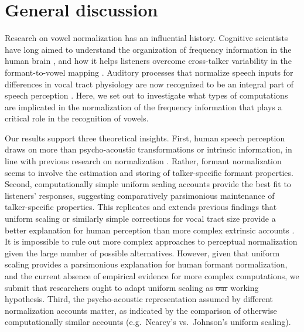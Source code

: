 \documentclass[preprint]{JASA}
\providecommand{\DIFadd}[1]{{\protect\color{blue}\uwave{#1}}} %
\providecommand{\DIFdel}[1]{{\protect\color{red}\sout{#1}}}                      %
\providecommand{\DIFaddbegin}{} %
\providecommand{\DIFaddend}{} %
\providecommand{\DIFdelbegin}{} %
\providecommand{\DIFdelend}{} %
\begin{document}
\section{General discussion}\label{sec:G-D}

Research on vowel normalization has an influential history. Cognitive scientists have long aimed to understand the organization of frequency information in the human brain \citep{stevens-volkmann1940, siegel1965}, and how it helps listeners overcome cross-talker variability in the formant-to-vowel mapping \citep[e.g.,][]{joos1948, fant1975, nordstrom-lindblom1975}. Auditory processes that normalize speech inputs for differences in vocal tract physiology are now recognized to be an integral part of speech perception \citep{mcmurray-jongman2011, johnson-sjerps2021, xie2023}. Here, we set out to investigate what types of computations are implicated in the normalization of the frequency information that plays a critical role in the recognition of vowels.

Our results support three theoretical insights. First, human speech perception draws on more than psycho-acoustic transformations or intrinsic information, in line with previous research on normalization \citep{nearey1989, ladefoged-broadbent1957, adank2004}. Rather, formant normalization seems to involve the estimation and storing of talker-specific formant properties. Second, computationally simple uniform scaling accounts provide the best fit to listeners' responses, suggesting comparatively parsimonious maintenance of talker-specific properties. This replicates and extends previous findings that uniform scaling or similarly simple corrections for vocal tract size provide a better explanation for human perception than more complex extrinsic accounts \citep{barreda2021, richter2017}. It is impossible to rule out more complex approaches to perceptual normalization given the large number of possible alternatives. However, given that uniform scaling provides a parsimonious explanation for human formant normalization, and the current absence of empirical evidence for more complex computations, we submit that researchers ought to adapt uniform scaling as \DIFdelbegin \DIFdel{our }\DIFdelend \DIFaddbegin \DIFadd{the }\DIFaddend working hypothesis. Third, the psycho-acoustic representation assumed by different normalization accounts matter, as indicated by the comparison of otherwise computationally similar accounts (e.g.~Nearey's vs.~Johnson's uniform scaling).
\end{document}

